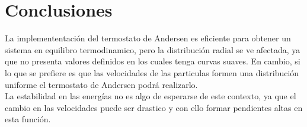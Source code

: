 \section{Conclusiones}
    La implemententación del termostato de Andersen es eficiente para obtener un sistema en equilibro termodinamico, pero la distribución radial
    se ve afectada, ya que no presenta valores definidos en los cuales tenga curvas suaves.
    En cambio, si lo que se prefiere es que las velocidades de las particulas formen una distribución uniforme el termostato de Andersen podrá
    realizarlo.\\
    La estabilidad en las energías no es algo de esperarse de este contexto, ya que el cambio en las velocidades puede ser drastico y con ello formar
    pendientes altas en esta función.